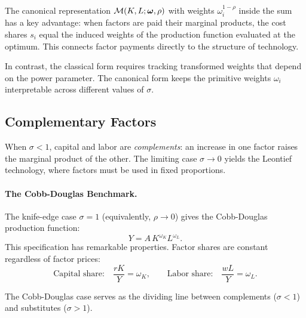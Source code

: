 \begin{calloutnote}
The canonical representation $\mathcal{M}(K, L; \boldsymbol{\omega}, \rho)$ with weights $\omega_i^{1-\rho}$ inside the sum has a key advantage: when factors are paid their marginal products, the cost shares $s_i$ equal the induced weights of the production function evaluated at the optimum. This connects factor payments directly to the structure of technology.

In contrast, the classical form requires tracking transformed weights that depend on the power parameter. The canonical form keeps the primitive weights $\omega_i$ interpretable across different values of $\sigma$.
\end{calloutnote}

\subsection{Complementary Factors}
\label{subsec:complementary-factors}

When $\sigma < 1$, capital and labor are \emph{complements}: an increase in one factor raises the marginal product of the other. The limiting case $\sigma \to 0$ yields the Leontief technology, where factors must be used in fixed proportions.

\paragraph{The Cobb-Douglas Benchmark.}
The knife-edge case $\sigma = 1$ (equivalently, $\rho \to 0$) gives the Cobb-Douglas production function:
\begin{equation}
Y = A \, K^{\omega_K} L^{\omega_L}.
\label{eq:cobb-douglas}
\end{equation}
This specification has remarkable properties. Factor shares are constant regardless of factor prices:
\begin{equation}
\text{Capital share:} \quad \frac{rK}{Y} = \omega_K, \qquad \text{Labor share:} \quad \frac{wL}{Y} = \omega_L.
\label{eq:cd-shares}
\end{equation}

The Cobb-Douglas case serves as the dividing line between complements ($\sigma < 1$) and substitutes ($\sigma > 1$).

